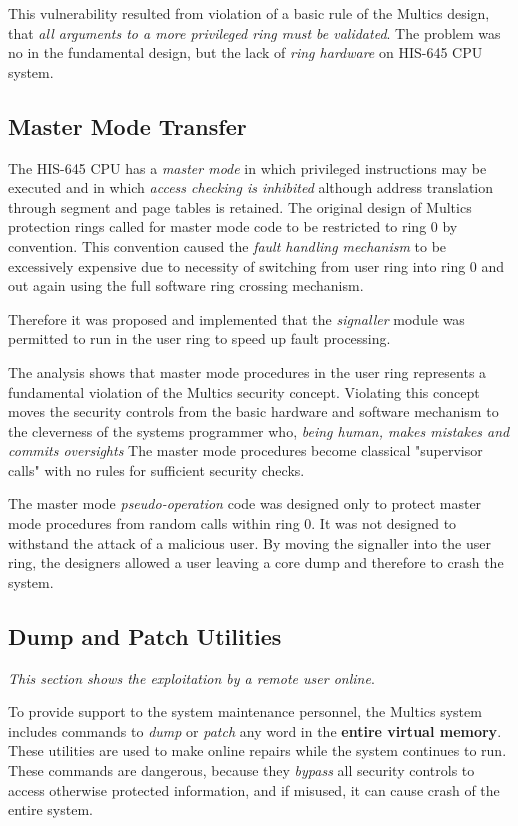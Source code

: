 This vulnerability resulted from violation of a basic rule of the Multics design, that \textit{all arguments to a more 
privileged ring must be validated}.
The problem was no in the fundamental design, but the lack of \textit{ring hardware} on HIS-645 CPU system.

\subsection{Master Mode Transfer}

The HIS-645 CPU has a \textit{master mode} in which privileged instructions may be executed and in 
which \textit{access checking is inhibited} although address translation through segment and page 
tables is retained. 
The original design of Multics protection rings called for master mode code to be restricted to ring 0 by convention.
This convention caused the \textit{fault handling mechanism} to be excessively expensive due to necessity of switching
from user ring into ring 0 and out again using the full software ring crossing mechanism.

Therefore it was proposed and implemented that the \textit{signaller} module  was permitted to run in the user 
ring to speed up fault processing.

The analysis shows that master mode procedures in the user ring represents a fundamental violation of the Multics 
security concept. Violating this concept moves the security controls from the basic hardware and software mechanism 
to the cleverness of the systems programmer who, \textit{being human, makes mistakes and commits oversights}
The master mode procedures become classical "supervisor calls" with no rules for sufficient security checks.

The master mode \textit{pseudo-operation} code was designed only to protect master mode procedures from random calls 
within ring 0. It was not designed to withstand the attack of a malicious user. By moving the signaller into the user 
ring, the designers allowed a user leaving a core dump and therefore to crash the system.


\subsection{Dump and Patch Utilities}

\textit{This section shows the exploitation by a remote user online}.

To provide support to the system maintenance personnel, the Multics system includes commands to \textit{dump} or 
\textit{patch} any word in the \textbf{entire virtual memory}. These utilities are used to make online repairs while 
the system continues to run. These commands are dangerous, because they \textit{bypass} all security controls to 
access otherwise protected information, and if misused, it can cause crash of the entire system.

